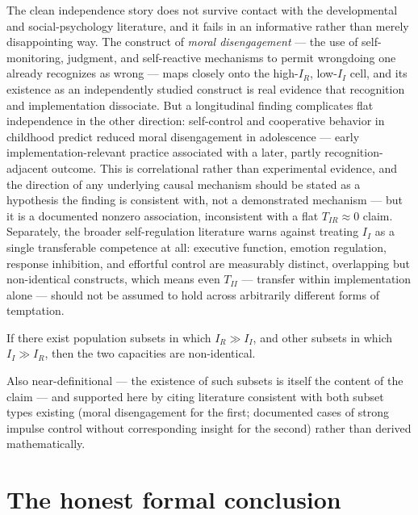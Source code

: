 The clean independence story does not survive contact with the developmental and social-psychology literature, and it fails in an informative rather than merely disappointing way. The construct of \emph{moral disengagement} --- the use of self-monitoring, judgment, and self-reactive mechanisms to permit wrongdoing one already recognizes as wrong --- maps closely onto the high-$I_R$, low-$I_I$ cell, and its existence as an independently studied construct is real evidence that recognition and implementation dissociate. But a longitudinal finding complicates flat independence in the other direction: self-control and cooperative behavior in childhood predict reduced moral disengagement in adolescence --- early implementation-relevant practice associated with a later, partly recognition-adjacent outcome. This is correlational rather than experimental evidence, and the direction of any underlying causal mechanism should be stated as a hypothesis the finding is consistent with, not a demonstrated mechanism --- but it is a documented nonzero association, inconsistent with a flat $T_{IR} \approx 0$ claim. Separately, the broader self-regulation literature warns against treating $I_I$ as a single transferable competence at all: executive function, emotion regulation, response inhibition, and effortful control are measurably distinct, overlapping but non-identical constructs, which means even $T_{II}$ --- transfer within implementation alone --- should not be assumed to hold across arbitrarily different forms of temptation.

\begin{proposition}[Dissociability]
If there exist population subsets in which $I_R \gg I_I$, and other subsets in which $I_I \gg I_R$, then the two capacities are non-identical.
\end{proposition}

Also near-definitional --- the existence of such subsets is itself the content of the claim --- and supported here by citing literature consistent with both subset types existing (moral disengagement for the first; documented cases of strong impulse control without corresponding insight for the second) rather than derived mathematically.

\section{The honest formal conclusion}


